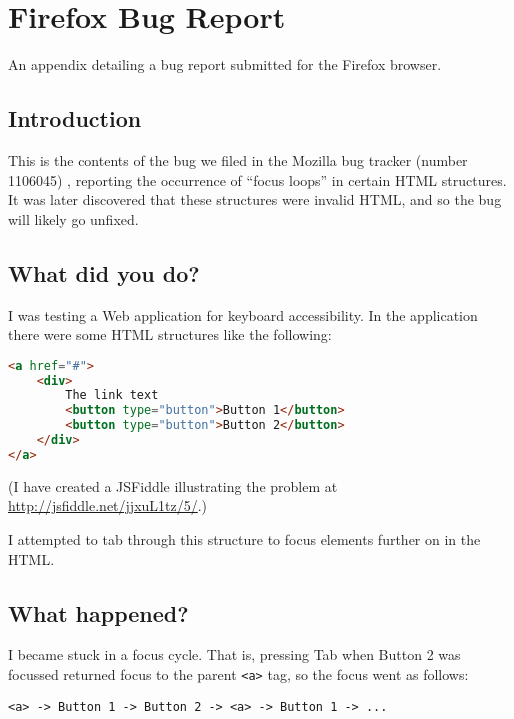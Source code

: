 \chapter{Firefox Bug Report} \label{Chapter:Firefox Bug Report}

\begin{preamble}
	An appendix detailing a bug report submitted for the Firefox browser.
\end{preamble}

\section{Introduction}

This is the contents of the bug we filed in the Mozilla bug tracker (number 1106045) \citep{FirefoxFocusLoopBug}, reporting the occurrence of ``focus loops'' in certain HTML structures. It was later discovered that these structures were invalid HTML, and so the bug will likely go unfixed.

\section{What did you do?}\label{what-did-you-do}

I was testing a Web application for keyboard accessibility. In the
application there were some HTML structures like the following:

\begin{lstlisting}[language=html]
<a href="#">
    <div>
        The link text
        <button type="button">Button 1</button>
        <button type="button">Button 2</button>
    </div>
</a>
\end{lstlisting}

(I have created a JSFiddle illustrating the problem at
\url{http://jsfiddle.net/jjxuL1tz/5/}.)

I attempted to tab through this structure to focus elements further on
in the HTML.

\section{What happened?}\label{what-happened}

I became stuck in a focus cycle. That is, pressing Tab when Button 2 was
focussed returned focus to the parent
\texttt{\textless{}a\textgreater{}} tag, so the focus went as follows:

\begin{verbatim}
<a> -> Button 1 -> Button 2 -> <a> -> Button 1 -> ...
\end{verbatim}

